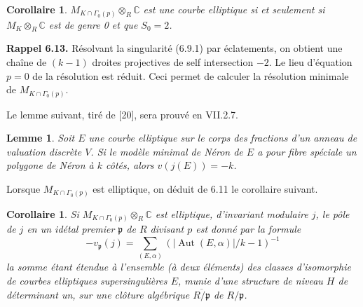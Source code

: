 \documentclass[10pt,a4paper]{amsart}
\theoremstyle{plain}
\newtheorem{lemma}[theorem]{Lemme}
\newtheorem{corollary}[theorem]{Corollaire}
\theoremstyle{definition}
\DeclareMathOperator{\Aut}{Aut}
\newcommand{\fp}{\mathfrak{p}}
\newcommand{\CC}{\mathbb{C}}
\begin{document}
\begin{corollary}
$M_{K \cap \Gamma_0(p)} \otimes_R \CC$ est une courbe elliptique si et seulement si $M_K \otimes_R \CC$ est de genre 0 et que $S_0 = 2$.
\end{corollary}

\medskip\noindent\textbf{Rappel 6.13.} R\'esolvant la singularit\'e (6.9.1) par \'eclatements, on obtient une cha\^ine de $(k-1)$ droites projectives de self intersection $-2$. Le lieu d'\'equation $p = 0$ de la r\'esolution est r\'eduit. Ceci permet de calculer la r\'esolution minimale de $M_{K \cap \Gamma_0(p)}$.

Le lemme suivant, tir\'e de [20], sera prouv\'e en VII.2.7.

\begin{lemma}
Soit $E$ une courbe elliptique sur le corps des fractions d'un anneau de valuation discr\`ete $V$. Si le mod\`ele minimal de N\'eron de $E$ a pour fibre sp\'eciale un polygone de N\'eron \`a $k$ c\^ot\'es, alors $v(j(E)) = -k$.
\end{lemma}

Lorsque $M_{K \cap \Gamma_0(p)}$ est elliptique, on d\'eduit de 6.11 le corollaire suivant.

\begin{corollary}
Si $M_{K \cap \Gamma_0(p)} \otimes_R \CC$ est elliptique, d'invariant modulaire $j$, le p\^ole de $j$ en un id\'etal premier $\fp$ de $R$ divisant $p$ est donn\'e par la formule
\[
-v_\fp(j) = \sum_{(E,\alpha)} (|\Aut(E,\alpha)|/k - 1)^{-1}
\]
la somme \'etant \'etendue \`a l'ensemble (\`a deux \'el\'ements) des classes d'isomorphie de courbes elliptiques supersinguli\`eres $E$, munie d'une structure de niveau $H$ de d\'eterminant un, sur une cl\^oture alg\'ebrique $\overline{R/\fp}$ de $R/\fp$.
\end{corollary}
\end{document}
